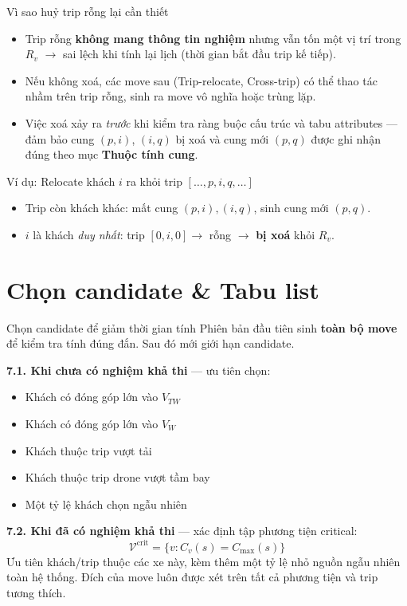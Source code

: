 \documentclass[aspectratio=169]{beamer}
\newcommand{\hl}[1]{\textcolor{blue!60!black}{\textbf{#1}}}
\begin{document}
\begin{frame}{Vì sao huỷ trip rỗng lại cần thiết}
  \begin{itemize}
    \item Trip rỗng \hl{không mang thông tin nghiệm} nhưng vẫn tốn một vị trí trong $R_v$ $\to$ sai lệch khi tính lại lịch (thời gian bắt đầu trip kế tiếp).
    \item Nếu không xoá, các move sau (Trip-relocate, Cross-trip) có thể thao tác nhầm trên trip rỗng, sinh ra move vô nghĩa hoặc trùng lặp.
    \item Việc xoá xảy ra \emph{trước} khi kiểm tra ràng buộc cấu trúc và tabu attributes — đảm bảo cung $(p, i)$, $(i, q)$ bị xoá và cung mới $(p,q)$ được ghi nhận đúng theo mục \hl{Thuộc tính cung}.
  \end{itemize}

  \vspace{1mm}
  \small
  \begin{block}{Ví dụ: Relocate khách $i$ ra khỏi trip $[\ldots,p,i,q,\ldots]$}
    \begin{itemize}
      \item Trip còn khách khác: mất cung $(p,i),(i,q)$, sinh cung mới $(p,q)$.
      \item $i$ là khách \emph{duy nhất}: trip $[0,i,0] \to$ rỗng $\to$ \hl{bị xoá} khỏi $R_v$.
    \end{itemize}
  \end{block}
\end{frame}

\section{Chọn candidate \& Tabu list}

\begin{frame}{Chọn candidate để giảm thời gian tính}
  \small Phiên bản đầu tiên sinh \hl{toàn bộ move} để kiểm tra tính đúng đắn. Sau đó mới giới hạn candidate.

  \vspace{2mm}
  \textbf{7.1. Khi chưa có nghiệm khả thi} — ưu tiên chọn:
  \begin{itemize}
    \item \small Khách có đóng góp lớn vào $V_{TW}$
    \item \small Khách có đóng góp lớn vào $V_W$
    \item \small Khách thuộc trip vượt tải
    \item \small Khách thuộc trip drone vượt tầm bay
    \item \small Một tỷ lệ khách chọn ngẫu nhiên
  \end{itemize}

  \vspace{2mm}
  \textbf{7.2. Khi đã có nghiệm khả thi} — xác định tập phương tiện critical:
  $$\mathcal{V}^{\text{crit}} = \{v : C_v(s) = C_{\max}(s)\}$$
  \small Ưu tiên khách/trip thuộc các xe này, kèm thêm một tỷ lệ nhỏ nguồn ngẫu nhiên toàn hệ thống. Đích của move luôn được xét trên tất cả phương tiện và trip tương thích.
\end{frame}
\end{document}
